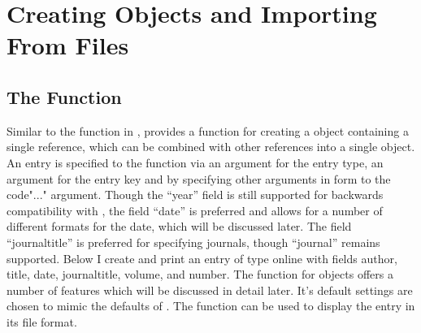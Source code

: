 \documentclass[article]{jss}\usepackage[]{graphicx}\usepackage[]{color}
\newcommand{\ourpkg}{\pkg{RefManageR}}
\begin{document}
\section[Creating BibEntry Objects and Importing From Files]{Creating  Objects and Importing From Files}\label{sec_create}


\subsection[The BibEntry Function]{The  Function}
Similar to the  function in , \ourpkg{} provides a function  for creating a  object containing a single reference, which can be combined with other references into a single  object.  An entry is specified to the  function via an argument  for the entry type, an argument  for the entry key and by specifying other arguments
in  form to the code{"..."} argument.  Though the ``year'' field is still supported for backwards compatibility with \Bibtex{}, the field ``date'' is preferred and allows for a number of different formats for the date, which will be discussed later.  The field ``journaltitle'' is preferred for specifying journals, though ``journal'' remains supported.  Below I create and print an entry of type online with fields author, title, date, journaltitle, volume, and number.  The  function for  objects offers a number of features which will be discussed in detail later.  It's default settings are chosen to mimic the defaults of \Biblatex{}.  The  function can be used to display the entry in its  file format.
\end{document}
